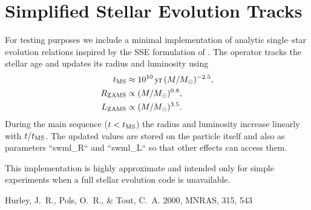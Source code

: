 \section{Simplified Stellar Evolution Tracks}
\label{sec:sse_tracks}

For testing purposes we include a minimal implementation of analytic
single--star evolution relations inspired by the SSE formulation of
\citet{Hurley2000}.  The operator tracks the stellar age and updates
its radius and luminosity using
\begin{align}
  t_{\rm MS} &\approx 10^{10}\,\mathrm{yr}\,(M/M_\odot)^{-2.5},\\
  R_{\rm ZAMS} &\propto (M/M_\odot)^{0.8},\\
  L_{\rm ZAMS} &\propto (M/M_\odot)^{3.5}.
\end{align}
During the main sequence ($t<t_{\rm MS}$) the radius and luminosity
increase linearly with $t/t_{\rm MS}$.  The updated values are stored
on the particle itself and also as parameters ``swml_R`` and
``swml_L`` so that other effects can access them.

This implementation is highly approximate and intended only for simple
experiments when a full stellar evolution code is unavailable.


\begin{thebibliography}{99}
 Hurley, J.~R., Pols, O.~R., \& Tout, C.~A. 2000, MNRAS, 315, 543
\end{thebibliography}
